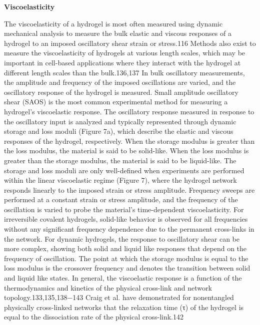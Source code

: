 \documentclass[../../main-notes.tex]{subfiles}
\begin{document}
\textbf{Viscoelasticity}

The viscoelasticity of a hydrogel is most often measured using dynamic mechanical analysis to measure the bulk elastic and viscous responses of a hydrogel to  an imposed oscillatory shear strain or stress.116 
Methods also exist to measure the viscoelasticity of hydrogels at various length scales, which may be important in cell-based applications where they interact with the hydrogel at different  length scales than the bulk.136,137 
In bulk oscillatory measurements, the amplitude and frequency of the imposed oscillations are varied, and the oscillatory response of the hydrogel is measured. 
Small amplitude oscillatory shear (SAOS) is the most common experimental method for measuring a hydrogel’s viscoelastic response. 
The oscillatory response measured in response to the oscillatory input is analyzed and typically represented through dynamic storage and loss moduli (Figure 7a), which describe the elastic and viscous responses of the hydrogel, respectively. 
When the storage modulus is greater than the loss modulus, the material is said to be solid-like. 
When the loss modulus is greater than the storage modulus, the material is said to be liquid-like. 
The storage and loss moduli are only well-defined when experiments are performed within the linear viscoelastic regime (Figure 7), where the hydrogel network responds linearly to the imposed strain or stress amplitude. 
Frequency sweeps are performed at a constant strain or stress amplitude, and the frequency of the oscillation is varied to probe the material’s time-dependent viscoelasticity. 
For irreversible covalent hydrogels, solid-like behavior is observed for all frequencies without any significant frequency dependence due to the permanent cross-links in the network. 
For dynamic hydrogels, the response to oscillatory shear can be more complex, showing both solid and liquid like responses that depend on the frequency of oscillation. 
The point at which the storage modulus is equal to the loss modulus is the crossover frequency and denotes the transition between solid and liquid like states. 
In general, the viscoelastic response is a function of the thermodynamics and kinetics of the physical  cross-link and network topology.133,135,138−143 
Craig et al. have demonstrated for nonentangled physically cross-linked networks that the relaxation time (τ) of the hydrogel is equal to  the dissociation rate of the physical cross-link.142 
\end{document}
